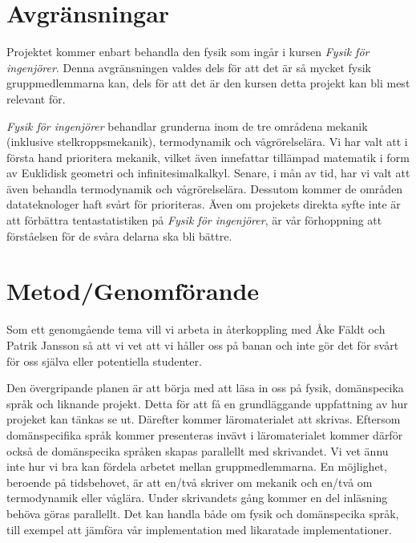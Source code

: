 \documentclass[12pt,a4paper]{article}
\begin{document}
\section{Avgränsningar}

Projektet kommer enbart behandla den fysik som ingår i kursen \textit{Fysik för
ingenjörer}. Denna avgränsningen valdes dels för att det är så mycket fysik
gruppmedlemmarna kan, dels för att det är den kursen detta projekt kan bli mest
relevant för.

\textit{Fysik för ingenjörer} behandlar grunderna inom de tre områdena mekanik
(inklusive stelkroppsmekanik), termodynamik och vågrörelselära. Vi har valt att
i första hand prioritera mekanik, vilket även innefattar tillämpad
matematik i form av Euklidisk geometri och
infinitesimalkalkyl. Senare, i mån av tid, har vi valt att även behandla
termodynamik och vågrörelselära. Dessutom kommer de områden datateknologer haft
svårt för prioriteras. Även om projekets direkta syfte inte är att förbättra
tentastatistiken på \textit{Fysik för ingenjörer}, är vår förhoppning att
förståelsen för de svåra delarna ska bli bättre.




\section{Metod/Genomförande}

Som ett genomgående tema vill vi arbeta in återkoppling med Åke Fäldt och Patrik
Jansson så att vi vet att vi håller oss på banan och inte gör det för svårt för
oss själva eller potentiella studenter.

Den övergripande planen är att börja med att läsa in oss på fysik, domänspecika
språk och liknande projekt. Detta för att få en grundläggande uppfattning av hur
projeket kan tänkas se ut. Därefter kommer läromaterialet att skrivas. Eftersom
domänspecifika språk kommer presenteras invävt i läromaterialet kommer därför
också de domänspecika språken skapas parallellt med skrivandet. Vi vet ännu inte
hur vi bra kan fördela arbetet mellan gruppmedlemmarna. En möjlighet, beroende
på tidsbehovet, är att en/två skriver om mekanik och en/två om termodynamik
eller våglära. Under skrivandets gång kommer en del inläsning behöva göras
parallellt. Det kan handla både om fysik och domänspecika språk, till exempel
att jämföra vår implementation med likaratade implementationer.
\end{document}
